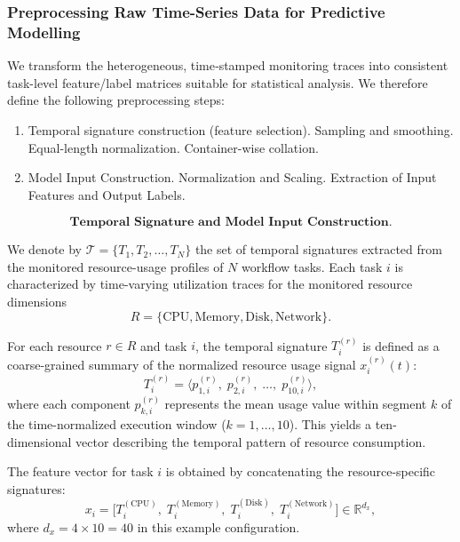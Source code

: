 \subsubsection{Preprocessing Raw Time-Series Data for Predictive Modelling}
\label{sec:data_preprocessing_predictive}
We transform the heterogeneous, time‐stamped monitoring traces into consistent task-level feature/label matrices suitable for statistical analysis. We therefore define the following preprocessing steps:

\begin{enumerate}
    \item Temporal signature construction (feature selection).
          \subitem Sampling and smoothing.
          \subitem Equal-length normalization.
          \subitem Container-wise collation.
    \item Model Input Construction.
          \subitem Normalization and Scaling.
          \subitem Extraction of Input Features and Output Labels.
\end{enumerate}


\[
    \textbf{Temporal Signature and Model Input Construction.}
\]

We denote by \( \mathcal{T} = \{ T_1, T_2, \dots, T_N \} \) the set of
temporal signatures extracted from the monitored resource-usage profiles
of \( N \) workflow tasks.
Each task \( i \) is characterized by time-varying utilization traces
for the monitored resource dimensions
\[
    R = \{ \text{CPU}, \text{Memory}, \text{Disk}, \text{Network} \}.
\]

\noindent
For each resource \( r \in R \) and task \( i \),
the temporal signature \( T_i^{(r)} \) is defined as a
coarse-grained summary of the normalized resource usage signal
\( x_i^{(r)}(t) \):
\[
    T_i^{(r)} =
    \bigl\langle
    p_{1,i}^{(r)},\;
    p_{2,i}^{(r)},\;
    \dots,\;
    p_{10,i}^{(r)}
    \bigr\rangle,
    \tag{1}
\]
where each component \( p_{k,i}^{(r)} \) represents the mean
usage value within segment \( k \) of the time-normalized
execution window (\( k = 1, \dots, 10 \)).
This yields a ten-dimensional vector describing the temporal pattern of
resource consumption.

\noindent
The feature vector for task \( i \) is obtained by concatenating
the resource-specific signatures:
\[
    x_i =
    \bigl[
    T_i^{(\text{CPU})},\;
    T_i^{(\text{Memory})},\;
    T_i^{(\text{Disk})},\;
    T_i^{(\text{Network})}
    \bigr]
    \in \mathbb{R}^{d_x},
\]
where \( d_x = 4 \times 10 = 40 \) in this example configuration.

